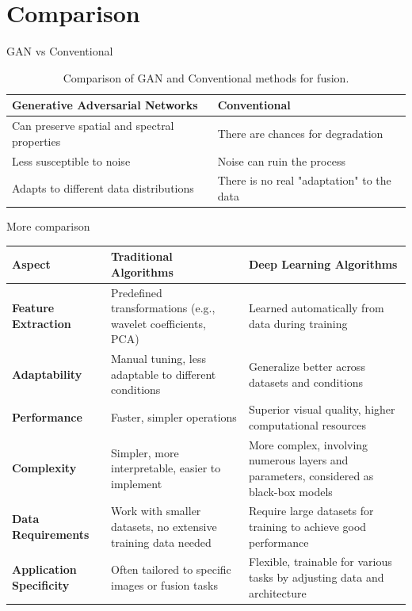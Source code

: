 \documentclass{beamer}
\begin{document}
\section{Comparison}
\begin{frame}{GAN vs Conventional}
    \begin{table}
        \centering
        \begin{tabular}{|| p{5cm} | p{5cm} ||} 
             \hline
             \textbf{Generative Adversarial Networks} & \textbf{Conventional} \\ [0.5ex] 
             \hline\hline
             Can preserve spatial and spectral properties & There are chances for degradation \\ 
             \hline
             Less susceptible to noise & Noise can ruin the process \\
             \hline
             Adapts to different data distributions & There is no real "adaptation" to the data \\
             \hline
        \end{tabular}
        \caption{Comparison of GAN and Conventional methods for fusion.}
        \label{table:tab-1}
    \end{table}
\end{frame}
\begin{frame}{More comparison}
    \begin{table}[h!]
        \centering
        \scriptsize %
        \begin{longtable}{p{2cm} p{4cm} p{4cm}}
            \toprule
            \textbf{Aspect} & \textbf{Traditional Algorithms} & \textbf{Deep Learning Algorithms} \\
            \midrule
            \textbf{Feature Extraction} & Predefined transformations (e.g., wavelet coefficients, PCA) & Learned automatically from data during training \\
            \midrule
            \textbf{Adaptability} & Manual tuning, less adaptable to different conditions & Generalize better across datasets and conditions \\
            \midrule
            \textbf{Performance} & Faster, simpler operations & Superior visual quality, higher computational resources \\
            \midrule
            \textbf{Complexity} & Simpler, more interpretable, easier to implement & More complex, involving numerous layers and parameters, considered as black-box models \\
            \midrule
            \textbf{Data Requirements} & Work with smaller datasets, no extensive training data needed & Require large datasets for training to achieve good performance \\
            \midrule
            \textbf{Application Specificity} & Often tailored to specific images or fusion tasks & Flexible, trainable for various tasks by adjusting data and architecture \\
            \bottomrule
        \end{longtable}
    \end{table}
\end{frame}
\end{document}
